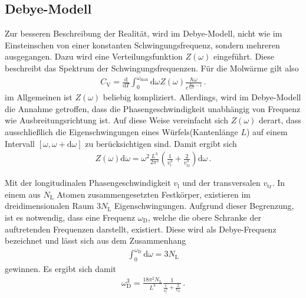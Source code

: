 \subsection{Debye-Modell}
\label{subsec:debye}
Zur besseren Beschreibung der Realität, wird im Debye-Modell,
nicht wie im Einsteinschen von einer konstanten Schwingungsfrequenz,
sondern mehreren ausgegangen.
Dazu wird eine Verteilungsfunktion $Z(\omega)$ eingeführt.
Diese beschreibt das Spektrum der Schwingungsfrequenzen.
Für die Molwärme gilt also
\begin{align}
	C_{\text{V}} = \frac{\mathrm{d}}{\mathrm{d}T}
	\int_{0}^{\omega_{\text{max}}} \mathrm{d}\omega Z(\omega)
	\frac{\hbar \omega}{e^{\frac{\hbar \omega}{k_{\text{B}} T} - 1}} \, . \label{eqn:t9}
\end{align}
im Allgemeinen ist $Z(\omega)$  beliebig kompliziert.
Allerdings, wird im Debye-Modell die Annahme getroffen,
dass die Phasengeschwindigkeit unabhängig von Frequenz wie
Ausbreitungsrichtung ist.
Auf diese Weise vereinfacht sich $Z(\omega)$ derart, dass
ausschließlich die Eigenschwingungen eines Würfels(Kantenlänge $L$)
auf einem Intervall $\left[ \omega, \omega + \mathrm{d}\omega \right]$
zu berücksichtigen sind.
Damit ergibt sich
\begin{align}
	Z(\omega) \mathrm{d}\omega =  \omega^{2} \frac{L^{3}}{2 \pi^{2}}
	\left( \frac{1}{v_{\text{l}}^{3}} +
	\frac{2}{v_{\text{tr}}^{3}} \right) \mathrm{d}\omega \, . \label{eqn:t10}
\end{align}

Mit der longitudinalen Phasengeschwindigkeit $v_{\text{l}}$
und der transversalen $v_{\text{tr}}$.
In einem aus $N_{\text{L}}$ Atomen zusammengesetzten Festkörper,
existieren im dreidimensionalen Raum $3N_{\text{L}}$ Eigenschwingungen.
Aufgrund dieser Begrenzung, ist es notwendig, dass eine
Frequenz $\omega_{\text{D}}$, welche die obere Schranke der auftretenden
Frequenzen darstellt, existiert.
Diese wird als Debye-Frequenz bezeichnet und lässt sich
aus dem Zusammenhang
\begin{align}
	\int_{0}^{\omega_{\text{D}}} \mathrm{d}\omega = 3 N_{\text{L}} \label{eqn:t11}
\end{align}
gewinnen.
Es ergibt sich damit
\begin{align}
	\omega_{\text{D}}^{3} = \frac{18 \pi^{2} N_{\text{L}}}{L^{3}}
	\frac{1}{\frac{1}{v_{\text{l}}^{3}} + \frac{2}{v_{\text{tr}}}} \, .\label{eqn:t12}
\end{align}

